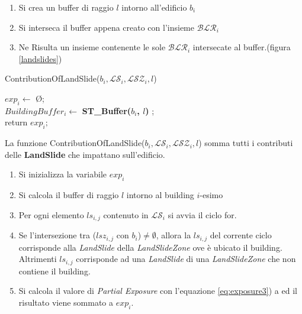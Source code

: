 \begin{enumerate}
	\item Si crea un buffer di raggio $l$ intorno all'edificio $b_i$
	\item Si interseca il buffer appena creato con l'insieme  $\mathcal{BLR}_i$
	\item Ne Risulta un insieme contenente le sole $\mathcal{BLR}_i$ intersecate al buffer.(figura \ref{landslides}) 
\end{enumerate}

\begin{algorithm}[H]
	
	\IncMargin{1em}
	\caption{ContributionOfLandSlide($b_i , \mathcal{LS}_i, \mathcal{LSZ}_i, l $) }
	\label{alg:four}
	\BlankLine
	\SetAlgoNoLine
	
	$ exp_i \leftarrow$ \O ;\\
	$ BuildingBuffer_i  \leftarrow $ \textbf{ST\_Buffer($b_i$, $l$)} ;\\
	return $exp_i;$
\end{algorithm}
La funzione ContributionOfLandSlide($b_i , \mathcal{LS}_i, \mathcal{LSZ}_i, l $) somma tutti i contributi delle \textbf{LandSlide} che impattano sull'edificio.
\begin{enumerate}
	\item Si inizializza la variabile $exp_i$ 
	\item Si calcola il buffer di raggio $l$ intorno al building $i$-esimo
	\item Per ogni elemento $ls_{i,j}$ contenuto in $\mathcal{LS}_i $ si avvia il ciclo for.
	\item Se l'intersezione tra ($lsz_{i,j}$ con $b_i$)$\not=\emptyset$, allora la $ls_{i,j}$ del corrente ciclo corrisponde alla	\textit{LandSlide} della \textit{LandSlideZone} ove è ubicato il building.\\
	Altrimenti $ls_{i,j}$ corrisponde ad una \textit{LandSlide} di una \textit{LandSlideZone} che non contiene il building. 
	\item Si calcola il valore di \textit{Partial Exposure} con l'equazione \ref{eq:exposure3}) a ed il risultato viene sommato a $exp_i$.
\end{enumerate}
